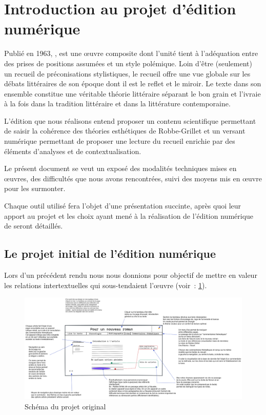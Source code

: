 \vspace{3cm}
\section{Introduction au projet d'édition numérique}
Publié en 1963, \punr{}, est une œuvre composite dont l'unité tient à l'adéquation entre des prises de positions assumées et un style polémique. Loin d'être (seulement) un recueil de préconisations stylistiques, le recueil offre une vue globale sur les débats littéraires de son époque dont il est le reflet et le miroir. Le texte dans son ensemble constitue une véritable théorie littéraire séparant le bon grain et l'ivraie à la fois dans la tradition littéraire et dans la littérature contemporaine.

L'édition que nous réalisons entend proposer un contenu scientifique permettant de saisir la cohérence des théories esthétiques de Robbe-Grillet et un versant numérique permettant de proposer une lecture du recueil enrichie par des éléments d'analyses et de contextualisation.




Le présent document se veut un exposé des modalités techniques mises en œuvres, des difficultés que nous avons rencontrées, suivi des moyens mis en œuvre pour les surmonter.

Chaque outil utilisé fera l'objet d'une présentation succinte, après quoi leur apport au projet et les choix ayant mené à la réalisation de l'édition numérique de \punr{} seront détaillés.



\subsection{Le projet initial de l'édition numérique}

Lors d'un précédent rendu nous nous donnions pour objectif de mettre en valeur les relations intertextuelles qui sous-tendaient l'œuvre (voir~: \ref{fig:projet}).

\begin{figure}[H]
    \centering
    \includegraphics[scale=0.3]{img/202211_mevel_punr_edition_numerique.png}
    \caption{Schéma du projet original}
    \label{fig:projet}
\end{figure}



